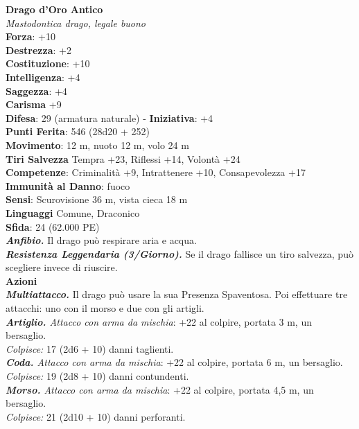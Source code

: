 \begin{multicols}{2}
\medskip\textbf{Drago d'Oro Antico}\\
\emph{Mastodontica drago, legale buono}\\
\textbf{Forza}: +10\\
\textbf{Destrezza}: +2\\
\textbf{Costituzione}: +10\\
\textbf{Intelligenza}: +4\\
\textbf{Saggezza}: +4\\
\textbf{Carisma} +9\\
\textbf{Difesa}: 29 (armatura naturale) - \textbf{Iniziativa}: +4\\
\textbf{Punti Ferita}: 546 (28d20 + 252) \\
\textbf{Movimento}: 12 m, nuoto 12 m, volo 24 m\\
\textbf{Tiri Salvezza} Tempra +23, Riflessi +14, Volontà +24\\
\textbf{Competenze}: Criminalità +9, Intrattenere +10, Consapevolezza +17\\
\textbf{Immunità al Danno}: fuoco\\
\textbf{Sensi}: Scurovisione 36 m, vista cieca 18 m\\
\textbf{Linguaggi} Comune, Draconico\\
\textbf{Sfida}: 24 (62.000 PE)\smallskip\\
\emph{\textbf{Anfibio.}} Il drago può respirare aria e acqua.\\
\emph{\textbf{Resistenza Leggendaria (3/Giorno).}} Se il drago fallisce un tiro salvezza, può scegliere invece di riuscire.\\
\smallskip\textbf{Azioni}\\
\emph{\textbf{Multiattacco.}} Il drago può usare la sua Presenza Spaventosa. Poi effettuare tre attacchi: uno con il morso e due con gli artigli.\\
\emph{\textbf{Artiglio.} Attacco con arma da mischia}: +22 al colpire, portata 3 m, un bersaglio.\\
\emph{Colpisce:} 17 (2d6 + 10) danni taglienti.\\
\emph{\textbf{Coda.} Attacco con arma da mischia}: +22 al colpire, portata 6 m, un bersaglio.\\
\emph{Colpisce:} 19 (2d8 + 10) danni contundenti.\\
\emph{\textbf{Morso.} Attacco con arma da mischia}: +22 al colpire, portata 4,5 m, un bersaglio.\\
\emph{Colpisce:} 21 (2d10 + 10) danni perforanti.\\

\end{multicols}
